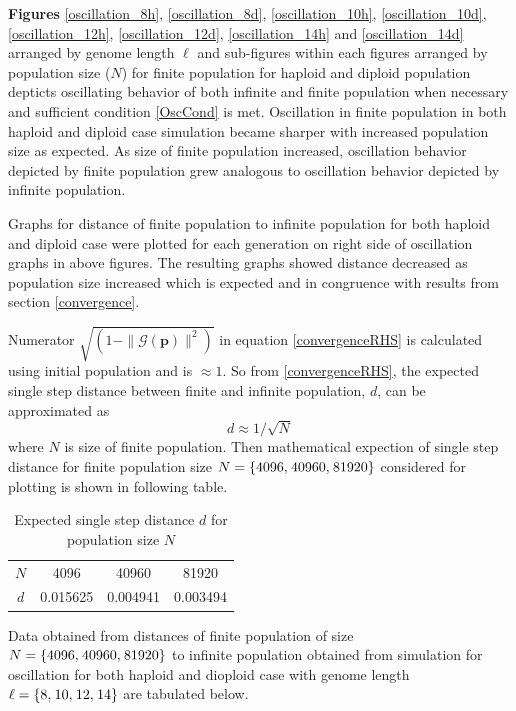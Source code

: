 


\textbf{ Figures} \ref{oscillation_8h}, \ref{oscillation_8d}, \ref{oscillation_10h}, \ref{oscillation_10d}, \ref{oscillation_12h}, \ref{oscillation_12d}, 
\ref{oscillation_14h} and \ref{oscillation_14d} arranged by genome length $\ell$ 
and sub-figures within each figures arranged by population size ($N$) for finite population for haploid and diploid population 
depticts oscillating behavior of both infinite and finite population when necessary and sufficient condition \ref{OscCond} is met. 
Oscillation in finite population in both haploid and diploid case simulation became sharper with increased population size as expected. 
As size of finite population increased, oscillation behavior depicted by finite population grew analogous to oscillation behavior 
depicted by infinite population. 

Graphs for distance of finite population to infinite population for both haploid and diploid case were plotted for 
each generation on right side of oscillation graphs in above figures. The resulting graphs showed distance decreased 
as population size increased which is expected and in congruence with results from section \ref{convergence}. 

Numerator $\sqrt{(1 - \|\mathcal{G}(\bm{p})\|^2)}$ in equation \ref{convergenceRHS} is calculated using initial population and is $\approx 1$. 
So from \ref{convergenceRHS}, the expected single step distance between finite and infinite population, $d$, can be approximated as
\[
d \approx 1/\sqrt{N}
\]
where $N$ is size of finite population.
Then mathematical expection of single step distance for finite population size $N = \{4096, \hspace{0.01in} 40960, \hspace{0.01in} 81920\}$ considered for plotting is shown in following table.
\begin{table}[ht]
\caption{Expected single step distance $d$ for population size $N$}
\centering
\begin{tabular}{c c c c}
\hline
$N$ & 4096 & 40960 & 81920 \\
$d$ & 0.015625 & 0.004941 & 0.003494 \\
\hline
\end{tabular}
\label{tableExpectedDistance}
\end{table}

Data obtained from distances of finite population of size $N = \{4096, \hspace{0.01in} 40960, \hspace{0.01in} 81920\}$ to infinite population obtained from simulation 
for oscillation for both haploid and dioploid case with genome length $\ell = \{8, \hspace{0.01in} 10, \hspace{0.01in} 12, \hspace{0.01in} 14\}$ are tabulated below.

